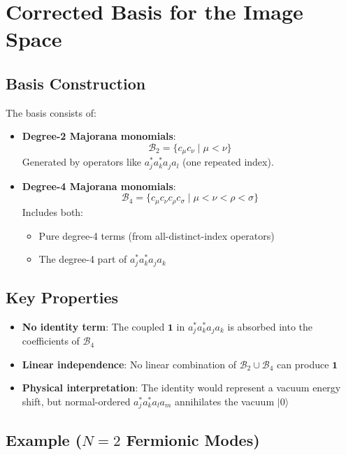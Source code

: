 \documentclass{article}
\begin{document}
\section*{Corrected Basis for the Image Space}

\subsection*{Basis Construction}

The basis consists of:

\begin{itemize}
\item \textbf{Degree-2 Majorana monomials}:
\[
\mathcal{B}_2 = \{c_\mu c_\nu \mid \mu < \nu\}
\]
Generated by operators like $a_j^* a_k^* a_j a_l$ (one repeated index).

\item \textbf{Degree-4 Majorana monomials}:
\[
\mathcal{B}_4 = \{c_\mu c_\nu c_\rho c_\sigma \mid \mu < \nu < \rho < \sigma\}
\]
Includes both:
\begin{itemize}
\item Pure degree-4 terms (from all-distinct-index operators)
\item The degree-4 part of $a_j^* a_k^* a_j a_k$
\end{itemize}
\end{itemize}

\subsection*{Key Properties}

\begin{itemize}
\item \textbf{No identity term}: The coupled $\mathbf{1}$ in $a_j^* a_k^* a_j a_k$ is absorbed into the coefficients of $\mathcal{B}_4$
\item \textbf{Linear independence}: No linear combination of $\mathcal{B}_2 \cup \mathcal{B}_4$ can produce $\mathbf{1}$
\item \textbf{Physical interpretation}: The identity would represent a vacuum energy shift, but normal-ordered $a_j^* a_k^* a_l a_m$ annihilates the vacuum $|0\rangle$
\end{itemize}

\subsection*{Example ($N=2$ Fermionic Modes)}
\end{document}
